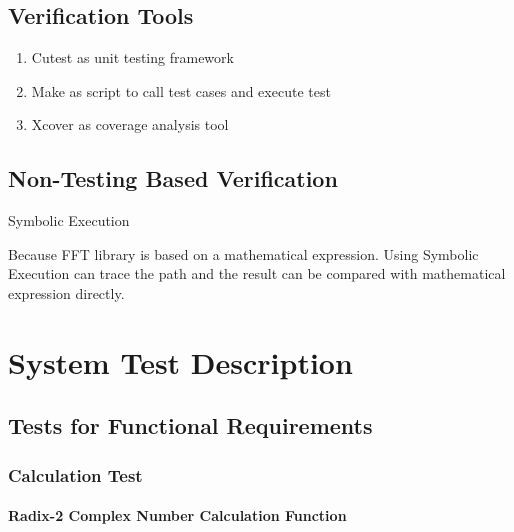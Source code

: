 \documentclass[12pt, titlepage]{article}
\begin{document}
\subsection{Verification Tools}
\begin{enumerate}
\item {{\large Cutest} as unit testing framework}
\item {{\large Make} as script to call test cases and execute test}
\item {{\large Xcover} as coverage analysis tool}
\end{enumerate}

		

\subsection{Non-Testing Based Verification}
{\large Symbolic Execution}

Because FFT library is based on a mathematical expression. Using Symbolic Execution can trace the path and the result can be compared with mathematical expression directly.



\section{System Test Description}
	
\subsection{Tests for Functional Requirements}

\subsubsection{Calculation Test}
		
\paragraph{Radix-2 Complex Number Calculation Function\\}
\end{document}
